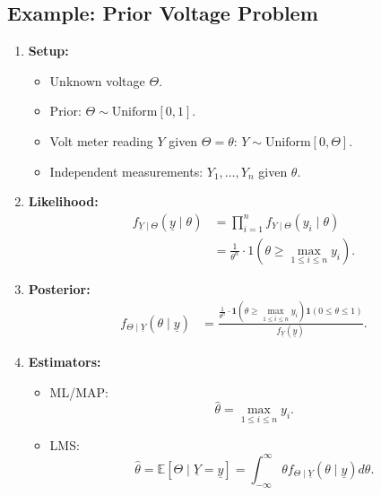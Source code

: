 \subsection{Example: Prior Voltage Problem}
\begin{example}
    \begin{enumerate}
        \item \textbf{Setup:}
        \begin{itemize}
            \item Unknown voltage \( \Theta \).
            \item Prior: \( \Theta \sim \text{Uniform}[0, 1] \).
            \item Volt meter reading \( Y \) given \( \Theta = \theta \): \( Y \sim \text{Uniform}[0, \Theta] \).
            \item Independent measurements: \( Y_1, \dots, Y_n \) given \( \theta \).
        \end{itemize}

        \item \textbf{Likelihood:}
        \begin{align*}
            f_{\underline{Y} \mid \Theta}(\underline{y} \mid \theta) &= \prod_{i=1}^n f_{Y \mid \Theta}(y_i \mid \theta) \\
            &= \frac{1}{\theta^n} \cdot 1(\theta \geq \max_{1 \leq i \leq n} y_i).
        \end{align*}

        \item \textbf{Posterior:}
        \begin{align*}
            f_{\Theta \mid \underline{Y}}(\theta \mid \underline{y}) &= \frac{\frac{1}{\theta^n} \cdot \mathbf{1}(\theta \geq \max_{1 \leq i \leq n} y_i) \mathbf{1} (0 \leq \theta \leq 1)}{f_{\underline{Y}}(\underline{y})}.
        \end{align*}

        \item \textbf{Estimators:}
        \begin{itemize}
            \item ML/MAP:
            \[
            \hat{\theta} = \max_{1 \leq i \leq n} y_i.
            \]

            \item LMS:
            \[
            \hat{\theta} = \mathbb{E}[\Theta \mid \underline{Y} = \underline{y}] = \int_{-\infty}^\infty \theta f_{\Theta \mid \underline{Y}}(\theta \mid \underline{y}) d\theta.
            \]
        \end{itemize}


\end{enumerate}
\end{example}
